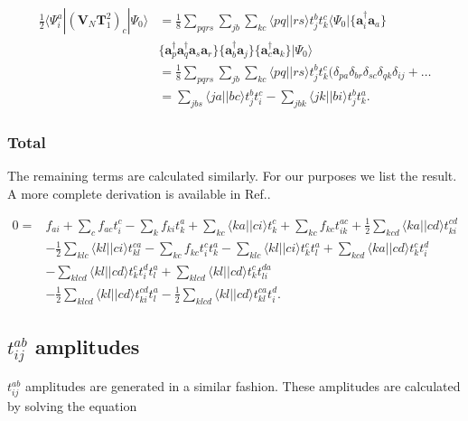 \begin{align}
\frac{1}{2} \langle \Psi_i^a | (\textbf{V}_N \textbf{T}_1^2)_c | \Psi_0 \rangle &
= \frac{1}{8} \sum_{pqrs} \sum_{jb} \sum_{kc} 
\langle pq || rs \rangle t_j^b t_k^c \langle \Psi_0 | 
\{ \textbf{a}^{\dag}_i \textbf{a}_a \} \nonumber \\ &
\{\textbf{a}^{\dag}_p \textbf{a}^{\dag}_q
\textbf{a}_s \textbf{a}_r \} \{\textbf{a}^{\dag}_b \textbf{a}_j \} \{\textbf{a}^{\dag}_c \textbf{a}_k \}
| \Psi_0 \rangle \nonumber \\ &
= \frac{1}{8} \sum_{pqrs} \sum_{jb} \sum_{kc} 
\langle pq || rs \rangle t_j^b t_k^c (
\delta_{pa} \delta_{br} \delta_{sc} \delta_{qk} \delta_{ij} + \dots \nonumber \\ & 
= \sum_{jbs} \langle ja || bc \rangle t_j^b t_i^c
- \sum_{jbk} \langle jk || bi \rangle t_j^b t_k^a .
\end{align}

\subsubsection{Total}
The remaining terms are calculated similarly. For our purposes we list the result. A more complete derivation is available in Ref.\cite{non_refer_numba1}.

\begin{align}
0 = & f_{ai} + \sum_c f_{ac} t_i^c - \sum_k f_{ki} t_k^a + \sum_{kc} \langle ka||ci \rangle t_k^c + \sum_{kc} f_{kc} t_{ik}^{ac} + \frac{1}{2} \sum_{kcd} \langle ka || cd \rangle t_{ki}^{cd} \label{T1equation} \\ &
- \frac{1}{2} \sum_{klc} \langle kl||ci\rangle t_{kl}^{ca} - \sum_{kc} f_{kc} t_i^c t_k^a - \sum_{klc} \langle kl || ci \rangle t_k^c t_l^a + \sum_{kcd} \langle ka||cd \rangle t_k^c t_i^d \nonumber \\ & 
- \sum_{klcd} \langle kl || cd \rangle t_k^c t_i^d t_l^a + \sum_{klcd} \langle kl||cd\rangle t_k^c t_{li}^{da} \nonumber \\ &
 - \frac{1}{2} \sum_{klcd} \langle kl || cd \rangle t_{ki}^{cd} t_l^a 
- \frac{1}{2} \sum_{klcd} \langle kl||cd \rangle t_{kl}^{ca} t_i^d . \nonumber
\end{align}

\subsection{$t_{ij}^{ab}$ amplitudes}
$t_{ij}^{ab}$ amplitudes are generated in a similar fashion. These amplitudes are calculated by solving the equation


